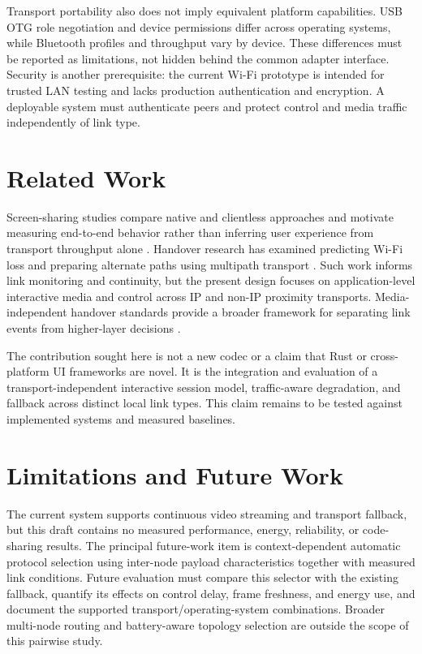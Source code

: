 \documentclass[conference]{IEEEtran}
\begin{document}
Transport portability also does not imply equivalent platform capabilities.
USB OTG role negotiation and device permissions differ across operating
systems, while Bluetooth profiles and throughput vary by device. These
differences must be reported as limitations, not hidden behind the common
adapter interface. Security is another prerequisite: the current Wi-Fi
prototype is intended for trusted LAN testing and lacks production
authentication and encryption. A deployable system must authenticate peers
and protect control and media traffic independently of link type.

\section{Related Work}
Screen-sharing studies compare native and clientless approaches and motivate
measuring end-to-end behavior rather than inferring user experience from
transport throughput alone \cite{huang2021}. Handover research has examined
predicting Wi-Fi loss and preparing alternate paths using multipath transport
\cite{hochst2019}. Such work informs link monitoring and continuity, but the
present design focuses on application-level interactive media and control
across IP and non-IP proximity transports. Media-independent handover
standards provide a broader framework for separating link events from
higher-layer decisions \cite{ieee80221}.

The contribution sought here is not a new codec or a claim that Rust or
cross-platform UI frameworks are novel. It is the integration and evaluation
of a transport-independent interactive session model, traffic-aware
degradation, and fallback across distinct local link types. This claim
remains to be tested against implemented systems and measured baselines.

\section{Limitations and Future Work}
The current system supports continuous video streaming and transport
fallback, but this draft contains no measured performance, energy,
reliability, or code-sharing results. The principal future-work item is
context-dependent automatic protocol selection using inter-node payload
characteristics together with measured link conditions. Future evaluation
must compare this selector with the existing fallback, quantify its effects
on control delay, frame freshness, and energy use, and document the supported
transport/operating-system combinations. Broader multi-node routing and
battery-aware topology selection are outside the scope of this pairwise
study.
\end{document}
